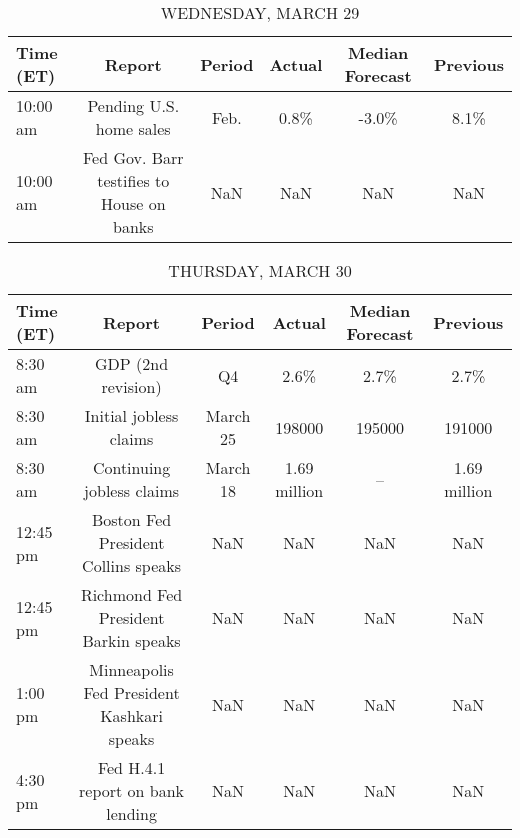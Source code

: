 \documentclass{article}%
\begin{document}
\begin{table}[htbp]%
\caption{WEDNESDAY, MARCH 29}%
\centering%
\begin{adjustbox}{width=1\textwidth}%
\begin{tabular}{lccccc}
\toprule
Time (ET) &                                    Report & Period & Actual & Median Forecast & Previous \\
\midrule
 10:00 am &                   Pending U.S. home sales &   Feb. &   0.8\% &           -3.0\% &     8.1\% \\
 10:00 am & Fed Gov. Barr testifies to House on banks &    NaN &    NaN &             NaN &      NaN \\
\bottomrule
\end{tabular}
%
\end{adjustbox}%
\end{table}

%


\begin{table}[htbp]%
\caption{THURSDAY, MARCH 30}%
\centering%
\begin{adjustbox}{width=1\textwidth}%
\begin{tabular}{lccccc}
\toprule
Time (ET) &                                    Report &   Period &       Actual & Median Forecast &     Previous \\
\midrule
  8:30 am &                        GDP (2nd revision) &       Q4 &         2.6\% &            2.7\% &         2.7\% \\
  8:30 am &                    Initial jobless claims & March 25 &       198000 &          195000 &       191000 \\
  8:30 am &                 Continuing jobless claims & March 18 & 1.69 million &              -- & 1.69 million \\
 12:45 pm &       Boston Fed President Collins speaks &      NaN &          NaN &             NaN &          NaN \\
 12:45 pm &      Richmond Fed President Barkin speaks &      NaN &          NaN &             NaN &          NaN \\
  1:00 pm & Minneapolis Fed President Kashkari speaks &      NaN &          NaN &             NaN &          NaN \\
  4:30 pm &          Fed H.4.1 report on bank lending &      NaN &          NaN &             NaN &          NaN \\
\bottomrule
\end{tabular}
%
\end{adjustbox}%
\end{table}
\end{document}
